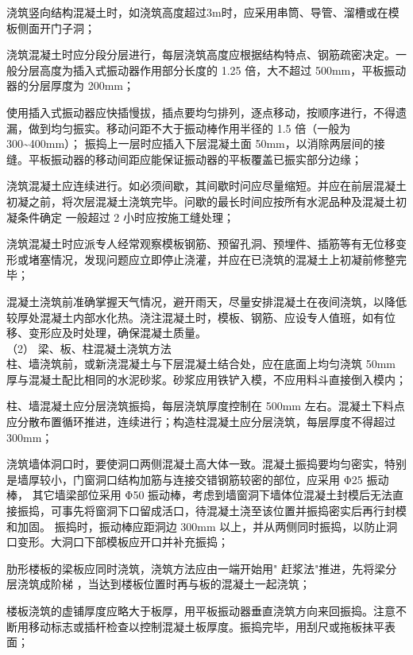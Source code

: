  浇筑竖向结构混凝土时，如浇筑高度超过3m时，应采用串筒、导管、溜槽或在模板侧面开门子洞；

 浇筑混凝土时应分段分层进行，每层浇筑高度应根据结构特点、钢筋疏密决定。一般分层高度为插入式振动器作用部分长度的 1.25 倍，大不超过 500mm，平板振动器的分层厚度为 200mm；

 使用插入式振动器应快插慢拔，插点要均匀排列，逐点移动，按顺序进行，不得遗漏，做到均匀振实。移动问距不大于振动棒作用半径的 1.5 倍（一般为 300\textasciitilde400mm）；
振捣上一层时应插入下层混凝土面 50mm，以消除两层间的接缝。平板振动器的移动间距应能保证振动器的平板覆盖已振实部分边缘；

 浇筑混凝土应连续进行。如必须间歇，其间歇时问应尽量缩短。并应在前层混凝土初凝之前，将次层混凝土浇筑完毕。问歇的最长时间应按所有水泥品种及混凝土初凝条件确定
一般超过 2 小时应按施工缝处理；

 浇筑混凝土时应派专人经常观察模板钢筋、预留孔洞、预埋件、插筋等有无位移变形或堵塞情况，发现问题应立即停止浇灌，并应在已浇筑的混凝土上初凝前修整完毕；

 混凝土浇筑前准确掌握天气情况，避开雨天，尽量安排混凝土在夜间浇筑，以降低较厚处混凝土内部水化热。浇注混凝土时，模板、钢筋、应设专人值班，如有位移、变形应及时处理，确保混凝土质量。\\

（2） 梁、板、柱混凝土浇筑方法\\

 柱、墙浇筑前，或新浇混凝土与下层混凝土结合处，应在底面上均匀浇筑 50mm 厚与混凝土配比相同的水泥砂浆。砂浆应用铁铲入模，不应用料斗直接倒入模内；

 柱、墙混凝土应分层浇筑振捣，每层浇筑厚度控制在 500mm 左右。混凝土下料点应分散布置循环推进，连续进行；构造柱混凝土应分层浇筑，每层厚度不得超过 300mm；

 浇筑墙体洞口时，要使洞口两侧混凝土高大体一致。混凝土振捣要均匀密实，特别是墙厚较小，门窗洞口结构加筋与连接交错钢筋较密的部位，应采用 Φ25 振动棒，
其它墙梁部位采用 Φ50 振动棒，考虑到墙窗洞下墙体位混凝土封模后无法直接振捣，可事先将窗洞下口留成活口，待混凝土浇至该位置并振捣密实后再行封模和加固。
振捣时，振动棒应距洞边 300mm 以上，并从两侧同时振捣，以防止洞口变形。大洞口下部模板应开口并补充振捣；

 肋形楼板的梁板应同时浇筑，浇筑方法应由一端开始用" 赶浆法"推进，先将梁分层浇筑成阶梯 ，当达到楼板位置时再与板的混凝土一起浇筑；

 楼板浇筑的虚铺厚度应略大于板厚，用平板振动器垂直浇筑方向来回振捣。注意不断用移动标志或插杆检查以控制混凝土板厚度。振捣完毕，用刮尺或拖板抹平表面；

